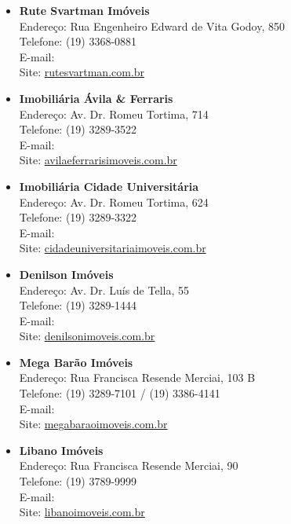 \begin{itemize}
\item   \textbf{Rute Svartman Imóveis}
		\\Endereço: Rua Engenheiro Edward de Vita Godoy, 850
		\\Telefone: (19) 3368-0881
		\\E-mail: 
		\\Site: \url{rutesvartman.com.br}

\item   \textbf{Imobiliária Ávila \& Ferraris}
		\\Endereço: Av. Dr. Romeu Tortima, 714
		\\Telefone: (19) 3289-3522
		\\E-mail: 
		\\Site: \url{avilaeferrarisimoveis.com.br}

\item   \textbf{Imobiliária Cidade Universitária}
		\\Endereço: Av. Dr. Romeu Tortima, 624
		\\Telefone: (19) 3289-3322
		\\E-mail: 
		\\Site: \url{cidadeuniversitariaimoveis.com.br}

\item   \textbf{Denilson Imóveis}
		\\Endereço: Av. Dr. Luís de Tella, 55
		\\Telefone: (19) 3289-1444
		\\E-mail: 
		\\Site: \url{denilsonimoveis.com.br}

\item   \textbf{Mega Barão Imóveis}
		\\Endereço: Rua Francisca Resende Merciai, 103 B
		\\Telefone: (19) 3289-7101 / (19) 3386-4141
		\\E-mail: 
		\\Site: \url{megabaraoimoveis.com.br}

\item   \textbf{Libano Imóveis}
		\\Endereço: Rua Francisca Resende Merciai, 90
		\\Telefone: (19) 3789-9999
		\\E-mail: 
		\\Site: \url{libanoimoveis.com.br}


\end{itemize}
